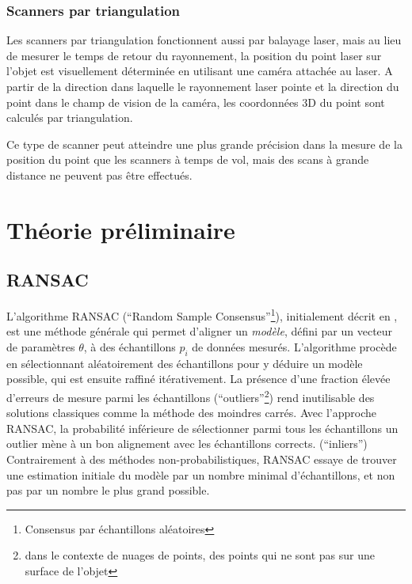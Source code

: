 \documentclass[a4paper,10pt]{scrreprt}
\begin{document}
\subsubsection{Scanners par triangulation}
Les scanners par triangulation fonctionnent aussi par balayage laser, mais au lieu de mesurer le temps de retour du rayonnement, la position du point laser sur l'objet est visuellement déterminée en utilisant une caméra attachée au laser. A partir de la direction dans laquelle le rayonnement laser pointe et la direction du point dans le champ de vision de la caméra, les coordonnées 3D du point sont calculés par triangulation. 

Ce type de scanner peut atteindre une plus grande précision dans la mesure de la position du point que les scanners à temps de vol, mais des scans à grande distance ne peuvent pas être effectués.

\section{Théorie préliminaire}

\subsection{RANSAC}
L'algorithme RANSAC (``Random Sample Consensus''\footnote{Consensus par échantillons aléatoires}), initialement décrit en \cite{Fisc1980}, est une méthode générale qui permet d'aligner un \emph{modèle}, défini par un vecteur de paramètres $\theta$, à des échantillons $p_i$ de données mesurés. L'algorithme procède en sélectionnant aléatoirement des échantillons pour y déduire un modèle possible, qui est ensuite raffiné itérativement. La présence d'une fraction élevée d'erreurs de mesure parmi les échantillons (``outliers''\footnote{dans le contexte de nuages de points, des points qui ne sont pas sur une surface de l'objet}) rend inutilisable des solutions classiques comme la méthode des moindres carrés. Avec l'approche RANSAC, la probabilité inférieure de sélectionner parmi tous les échantillons un outlier mène à un bon alignement avec les échantillons corrects. (``inliers'') Contrairement à des méthodes non-probabilistiques, RANSAC essaye de trouver une estimation initiale du modèle par un nombre minimal d'échantillons, et non pas par un nombre le plus grand possible.
\end{document}
